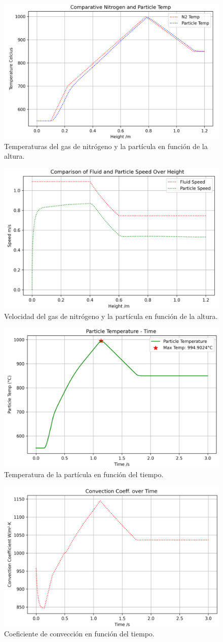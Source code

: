 \documentclass[11pt,stdletter,orderfromtodate,sigleft,twoside]{report}
\begin{document}
\begin{figure}[H]
    \centering
    \includegraphics[width=0.5\linewidth]{figures/Cte1.png}
    \caption{Temperaturas del gas de nitrógeno y la partícula en función de la altura.}
    \label{fig:enter-label}
\end{figure}

\begin{figure}[H]
    \centering
    \includegraphics[width=0.5\linewidth]{figures/Cte2.png}
    \caption{Velocidad del gas de nitrógeno y la partícula en función de la altura.}
    \label{fig:enter-label}
\end{figure}

\begin{figure}[H]
    \centering
    \includegraphics[width=0.5\linewidth]{figures/Cte5.png}
    \caption{Temperatura de la partícula en función del tiempo.}
    \label{fig:enter-label}
\end{figure}

\begin{figure}[H]
    \centering
    \includegraphics[width=0.5\linewidth]{figures/Cte6.png}
    \caption{Coeficiente de convección en función del tiempo.}
    \label{fig:enter-label}
\end{figure}
\end{document}
